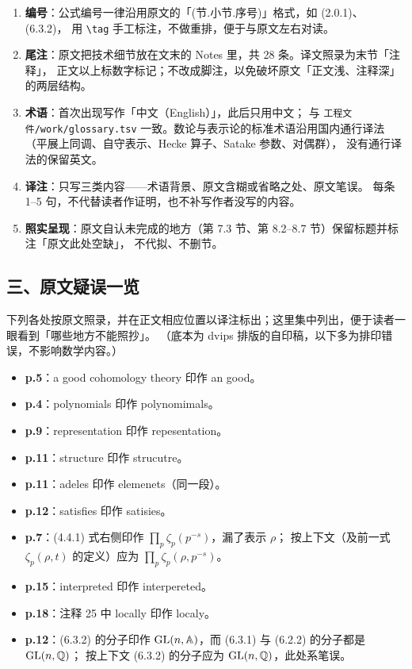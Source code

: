 \begin{enumerate}[leftmargin=2.2em,itemsep=2pt]
\item \textbf{编号}：公式编号一律沿用原文的「(节.小节.序号)」格式，如 (2.0.1)、(6.3.2)，
      用 \verb|\tag| 手工标注，不做重排，便于与原文左右对读。
\item \textbf{尾注}：原文把技术细节放在文末的 Notes 里，共 28 条。译文照录为末节「注释」，
      正文以上标数字标记；不改成脚注，以免破坏原文「正文浅、注释深」的两层结构。
\item \textbf{术语}：首次出现写作「中文（English）」，此后只用中文；
      与 \texttt{工程文件/work/glossary.tsv} 一致。数论与表示论的标准术语沿用国内通行译法
      （平展上同调、自守表示、Hecke 算子、Satake 参数、对偶群），
      没有通行译法的保留英文。
\item \textbf{译注}：只写三类内容——术语背景、原文含糊或省略之处、原文笔误。
      每条 1–5 句，不代替读者作证明，也不补写作者没写的内容。
\item \textbf{照实呈现}：原文自认未完成的地方（第 7.3 节、第 8.2–8.7 节）保留标题并标注「原文此处空缺」，
      不代拟、不删节。
\end{enumerate}

\subsection*{三、原文疑误一览}

下列各处按原文照录，并在正文相应位置以译注标出；这里集中列出，便于读者一眼看到「哪些地方不能照抄」。
（底本为 dvips 排版的自印稿，以下多为排印错误，不影响数学内容。）

\begin{itemize}[leftmargin=2.2em,itemsep=3pt]
\item \textbf{p.5}：a good cohomology theory 印作 an good。
\item \textbf{p.4}：polynomials 印作 polynomimals。
\item \textbf{p.9}：representation 印作 repesentation。
\item \textbf{p.11}：structure 印作 strucutre。
\item \textbf{p.11}：adeles 印作 elemenets（同一段）。
\item \textbf{p.12}：satisfies 印作 satisies。
\item \textbf{p.7}：(4.4.1) 式右侧印作 $\prod_p\zeta_p(p^{-s})$，漏了表示 $\rho$；
      按上下文（及前一式 $\zeta_p(\rho,t)$ 的定义）应为 $\prod_p\zeta_p(\rho,p^{-s})$。
\item \textbf{p.15}：interpreted 印作 interpereted。
\item \textbf{p.18}：注释 25 中 locally 印作 localy。
\item \textbf{p.12}：(6.3.2) 的分子印作 $\mathrm{GL}(n,\mathbb{A})$，而 (6.3.1) 与 (6.2.2) 的分子都是 $\mathrm{GL}(n,\mathbb{Q})$；
      按上下文 (6.3.2) 的分子应为 $\mathrm{GL}(n,\mathbb{Q})$，此处系笔误。
\end{itemize}


